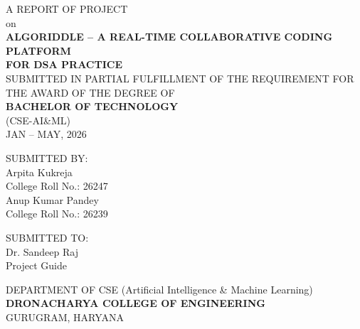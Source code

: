 \begin{titlepage}
\begin{center}

\vspace*{1cm}

{\fontsize{14}{17}\selectfont A REPORT OF PROJECT}\\[0.5cm]
{\fontsize{14}{17}\selectfont on}\\[0.5cm]
{\fontsize{14}{17}\bfseries\selectfont ALGORIDDLE -- A REAL-TIME COLLABORATIVE CODING PLATFORM\\FOR DSA PRACTICE}\\[1.5cm]

{\fontsize{12}{14}\selectfont SUBMITTED IN PARTIAL FULFILLMENT OF THE REQUIREMENT FOR THE AWARD OF THE DEGREE OF}\\[0.5cm]

{\fontsize{14}{17}\bfseries\selectfont BACHELOR OF TECHNOLOGY}\\[0.3cm]
{\fontsize{14}{17}\selectfont (CSE-AI\&ML)}\\[1.5cm]

{\fontsize{14}{17}\selectfont JAN -- MAY, 2026}\\[2cm]

\begin{minipage}[t]{0.45\textwidth}
\raggedright
{\fontsize{12}{14}\selectfont SUBMITTED BY:}\\[0.3cm]
{\fontsize{12}{14}\selectfont Arpita Kukreja}\\
{\fontsize{12}{14}\selectfont College Roll No.: 26247}\\[0.3cm]
{\fontsize{12}{14}\selectfont Anup Kumar Pandey}\\
{\fontsize{12}{14}\selectfont College Roll No.: 26239}\\
\end{minipage}
\hfill
\begin{minipage}[t]{0.45\textwidth}
\raggedleft
{\fontsize{12}{14}\selectfont SUBMITTED TO:}\\[0.3cm]
{\fontsize{12}{14}\selectfont Dr. Sandeep Raj}\\
{\fontsize{12}{14}\selectfont Project Guide}\\
\end{minipage}

\vfill

{\fontsize{12}{14}\selectfont DEPARTMENT OF CSE (Artificial Intelligence \& Machine Learning)}\\[0.3cm]
{\fontsize{14}{17}\bfseries\selectfont DRONACHARYA COLLEGE OF ENGINEERING}\\[0.2cm]
{\fontsize{14}{17}\selectfont GURUGRAM, HARYANA}

\end{center}
\end{titlepage}
